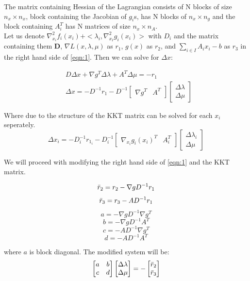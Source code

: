 The matrix containing Hessian of the Lagrangian consists of N blocks of size $n_x \times n_x$, block containing the Jacobian of $g_i$s, has N blocks of $n_x \times n_g$ and the block containing $A_i^{T}$ has N matrices of size $n_x \times n_A$.\\

Let us denote $\nabla_{x_i}^2 f_i(x_i) + <\lambda_i, \nabla_{x_I}^2 g_i(x_i)>$ with $D_i$ and the matrix containing them $\mathbf{D}$, $ \nabla L(x,\lambda,\mu)$ as $r_1$, $g(x)$ as $r_2$, and $ \sum\limits_{i \in I} A_{i} x_{i} - b $ as $r_3$ in the right hand side of \ref{eqn:1}. Then we can solve for $\Delta x$:

\begin{align*}
& D \Delta x + \nabla g^T \Delta \lambda + A^T \Delta \mu = - r_1 \\
& \Delta x = - D^{-1} r_1 - D^{-1} \begin{bmatrix}
    \nabla g^T & A^T
\end{bmatrix}
\begin{bmatrix}
    \Delta \lambda \\
    \Delta \mu
\end{bmatrix}
\end{align*}

Where due to the structure of the KKT matrix can be solved for each $x_i$ seperately.
\[
\Delta x_i = - D_i^{-1} r_{1_i} - D_i^{-1} \begin{bmatrix}
\nabla_{x_i} g_i(x_i)^T & A_i^T
\end{bmatrix}
\begin{bmatrix}
    \Delta \lambda_i \\
    \Delta \mu
\end{bmatrix}
\]
    
We will proceed with modifying the right hand side of \ref{eqn:1} and the KKT matrix.

\[\Bar{r}_2 = r_2 - \nabla g D^{-1} r_1\]
\[\Bar{r}_3 = r_3 - A D^{-1} r_1\]
\[
a = - \nabla g D^{-1} \nabla g^T
\]
\[
b = - \nabla g D^{-1} A^T
\]
\[
c = - A D^{-1} \nabla g^T
\]
\[
d = - A D^{-1} A^T
\]

 where $a$ is block diagonal. The modified system will be:
 \[
 \begin{bmatrix}
     a & b\\
     c & d\\
 \end{bmatrix}
 \begin{bmatrix}
     \Delta \lambda \\
     \Delta \mu
 \end{bmatrix} = -
 \begin{bmatrix}
     \Bar{r}_2 \\
     \Bar{r}_3
 \end{bmatrix}
 \]

